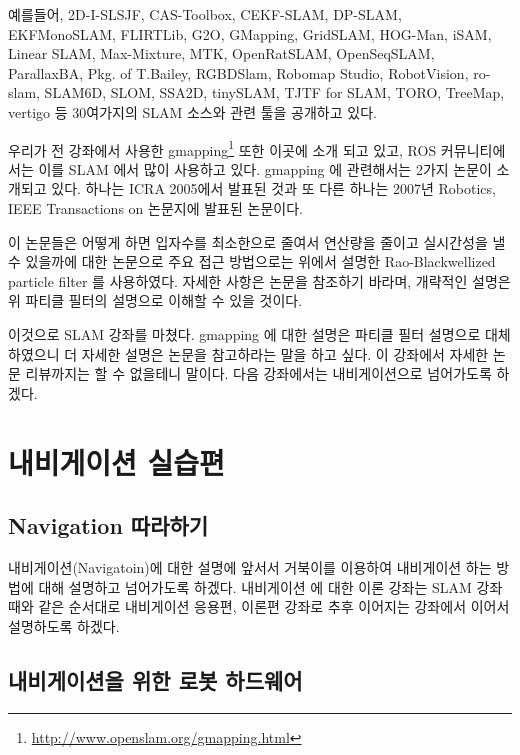 예를들어, 2D-I-SLSJF, CAS-Toolbox, CEKF-SLAM, DP-SLAM, EKFMonoSLAM, FLIRTLib, G2O, GMapping, GridSLAM, HOG-Man, iSAM, Linear SLAM, Max-Mixture, MTK, OpenRatSLAM, OpenSeqSLAM, ParallaxBA, Pkg. of T.Bailey, RGBDSlam, Robomap Studio, RobotVision, ro-slam, SLAM6D, SLOM, SSA2D, tinySLAM, TJTF for SLAM, TORO, TreeMap, vertigo 등 30여가지의 SLAM 소스와 관련 툴을 공개하고 있다.

우리가 전 강좌에서 사용한 gmapping\footnote{\url{http://www.openslam.org/gmapping.html}} 또한 이곳에 소개 되고 있고, ROS 커뮤니티에서는 이를 SLAM 에서 많이 사용하고 있다. gmapping 에 관련해서는 2가지 논문\cite{grisetti2005improving}\cite{grisetti2007improved}이 소개되고 있다. 하나는 ICRA 2005에서 발표된 것과 또 다른 하나는 2007년 Robotics, IEEE Transactions on 논문지에 발표된 논문이다.

이 논문들은 어떻게 하면 입자수를 최소한으로 줄여서 연산량을 줄이고 실시간성을 낼 수 있을까에 대한 논문으로 주요 접근 방법으로는 위에서 설명한 Rao-Blackwellized particle filter 를 사용하였다. 자세한 사항은 논문을 참조하기 바라며, 개략적인 설명은 위 파티클 필터의 설명으로 이해할 수 있을 것이다.

이것으로 SLAM 강좌를 마쳤다. gmapping 에 대한 설명은 파티클 필터 설명으로 대체하였으니 더 자세한 설명은 논문을 참고하라는 말을 하고 싶다. 이 강좌에서 자세한 논문 리뷰까지는 할 수 없을테니 말이다. 다음 강좌에서는 내비게이션으로 넘어가도록 하겠다.

\newpage
\section{내비게이션 실습편}
\label{sec:NavigationExe}

\subsection{Navigation 따라하기}

내비게이션(Navigatoin)에 대한 설명에 앞서서 거북이를 이용하여 내비게이션 하는 방법에 대해 설명하고 넘어가도록 하겠다. 내비게이션 에 대한 이론 강좌는 SLAM 강좌때와 같은 순서대로 내비게이션 응용편, 이론편 강좌로 추후 이어지는 강좌에서 이어서 설명하도록 하겠다.

\subsection{내비게이션을 위한 로봇 하드웨어}

